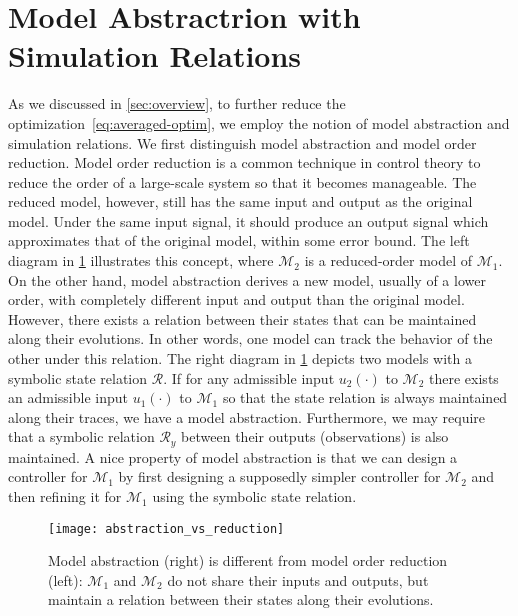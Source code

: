 \section{Model Abstractrion with Simulation Relations}
\label{sec:abstraction}

As we discussed in \cref{sec:overview}, to further reduce the optimization~\eqref{eq:averaged-optim}, we employ the notion of model abstraction and simulation relations.
We first distinguish model abstraction and model order reduction.
Model order reduction is a common technique in control theory to reduce the order of a large-scale system so that it becomes manageable. The reduced model, however, still has
the same input and output as the original model. Under the same input signal, %
it should produce an output signal which approximates that of
the original model, within some error bound. The left diagram in
\cref{fig:reduction-vs-abstraction} illustrates this concept, where
$\mathcal{M}_2$ is a reduced-order model of $\mathcal{M}_1$. On the other
hand, model abstraction derives a new model, usually of a lower order, with
completely different input and output than the original model. However, there
exists a relation between their states that can be maintained
along their evolutions. In other words, one model can track the behavior of
the other under this relation. The right diagram in
\cref{fig:reduction-vs-abstraction} depicts two models with a symbolic state relation $\mathcal{R}$. %
If for any admissible input $u_2
(\cdot)$ to $\mathcal{M}_2$ there exists an admissible input $u_1 (\cdot)$ to
$\mathcal{M}_1$ so that the state relation is always maintained along their
traces, %
we have a model abstraction. Furthermore, we may
require that a symbolic relation $\mathcal{R}_y$ between their outputs (observations) is also
maintained. A nice property of model abstraction is that we can design a
controller for $\mathcal{M}_1$ by first designing a supposedly simpler
controller for $\mathcal{M}_2$ and then refining it for $\mathcal{M}_1$ using
the symbolic state relation.

\begin{figure}[tb]
\centering
\texttt{[image: abstraction\_vs\_reduction]}
\vspace{-6pt}
\caption{\label{fig:reduction-vs-abstraction}Model abstraction (right) is
  different from model order reduction (left): %
  $\mathcal{M}_{1}$ and $\mathcal{M}_{2}$ do not share their %
  inputs and outputs, but %
  maintain a relation between their states along their evolutions.}
\vspace{-12pt}
\end{figure}


